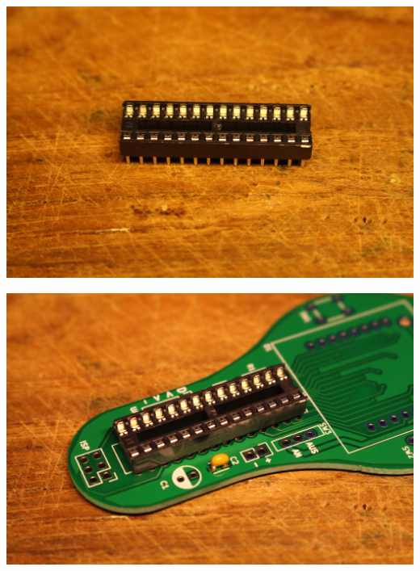 \documentclass{article}
\begin{document}
\begin{minipage}[b]{0.5\textwidth}
	\includegraphics[width=\textwidth]{Bilder2021/IMG_8129.JPG}
\end{minipage}
\begin{minipage}[b]{0.5\textwidth}
	\includegraphics[width=\textwidth]{Bilder2021/IMG_8130.JPG}
\end{minipage}

\vspace{0.5cm}
\end{document}
